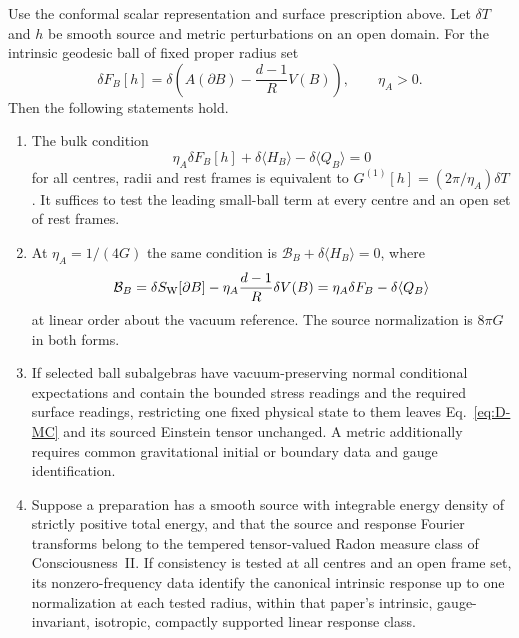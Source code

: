 \begin{proposition}
\label{prop:common-source-bridge}
Use the conformal scalar representation and surface prescription above.
Let $\delta T$ and $h$ be smooth source and metric perturbations on an
open domain. For the intrinsic geodesic ball of fixed proper radius set
\[
 \delta F_B[h]=\delta\left(A(\partial B)-\frac{d-1}{R}V(B)\right),
 \qquad \eta_A>0 .
\]
Then the following statements hold.
\begin{enumerate}
\item The bulk condition
\begin{equation}
 \eta_A\delta F_B[h]+\delta\langle H_B\rangle
                 -\delta\langle Q_B\rangle=0
 \label{eq:D-MC}
\end{equation}
for all centres, radii and rest frames is equivalent to
$G^{(1)}[h]=(2\pi/\eta_A)\delta T$.
It suffices to test the leading small-ball term at every centre and
an open set of rest frames.
\item At $\eta_A=1/(4G)$ the same condition is
$\mathcal B_B+\delta\langle H_B\rangle=0$, where
\[
 \mathcal B_B=\delta S_{\rm W}[\partial B]
            -\eta_A\frac{d-1}{R}\delta V(B)
            =\eta_A\delta F_B-\delta\langle Q_B\rangle
\]
at linear order about the vacuum reference. The source normalization is
$8\pi G$ in both forms.
\item If selected ball subalgebras have vacuum-preserving normal
conditional expectations and contain the bounded stress readings and
the required surface readings, restricting one fixed physical state
to them leaves Eq.~\eqref{eq:D-MC} and its sourced Einstein tensor
unchanged. A metric additionally requires common gravitational initial
or boundary data and gauge identification.
\item Suppose a preparation has a smooth source with integrable energy
density of strictly positive total energy, and that the source and
response Fourier transforms belong to the tempered tensor-valued Radon
measure class of Consciousness~II. If consistency is tested at all
centres and an open frame set, its nonzero-frequency data identify the
canonical intrinsic response up to one normalization at each tested
radius, within that paper's intrinsic, gauge-invariant, isotropic,
compactly supported linear response class.
\end{enumerate}
\end{proposition}
